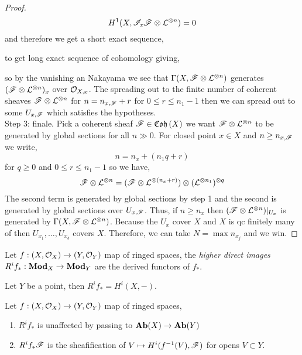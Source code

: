 \documentclass[12pt]{article}
\begin{document}
\begin{proof}
\[ H^1(X, \mathscr{I}_x \mathscr{F} \otimes \mathcal{L}^{\otimes n}) = 0 \]
and therefore we get a short exact sequence,
\begin{center}
\end{center}
to get long exact sequence of cohomology giving,
\begin{center}
\end{center}
so by the vanishing an Nakayama we see that $\Gamma(X, \mathscr{F} \otimes \mathcal{L}^{\otimes n})$ generates $(\mathscr{F} \otimes \mathcal{L}^{\otimes n})_x$ over $\mathcal{O}_{X, x}$. The spreading out to the finite number of coherent sheaves $\mathscr{F} \otimes \mathcal{L}^{\otimes n}$ for $n = n_{x, \mathscr{F}} + r$ for $0 \le r \le n_1 - 1$ then we can spread out to some $U_{x, \mathscr{F}}$ which satisfies the hypotheses. 
\bigskip\\
Step 3: finale. Pick a coherent sheaf $\mathscr{F} \in \mathfrak{Coh}\left(X\right)$ we want $\mathscr{F} \otimes \mathcal{L}^{\otimes n}$ to be generated by global sections for all $n \gg 0$. For closed point $x \in X$ and $n \ge n_{x, \mathscr{F}}$ we write,
\[ n = n_x + (n_1 q + r) \]
for $q \ge 0$ and $0 \le r \le n_1 - 1$ so we have,
\[ \mathscr{F} \otimes \mathcal{L}^{\otimes n} = (\mathscr{F} \otimes \mathcal{L}^{\otimes (n_x + r)}) \otimes (\mathcal{L}^{\otimes n_1})^{\otimes q} \]
The second term is generated by global sections by step 1 and the second is generated by global sections over $U_{x, \mathscr{F}}$. Thus, if $n \ge n_x$ then $(\mathscr{F} \otimes \mathcal{L}^{\otimes n})|_{U_x}$ is generated by $\Gamma(X, \mathscr{F} \otimes \mathcal{L}^{\otimes n})$. Because the $U_x$ cover $X$ and $X$ is qc finitely many of then $U_{x_1}, \dots, U_{x_b}$ covers $X$. Therefore, we can take $N = \max{n_{x_j}}$ and we win.  
\end{proof}

\begin{defn}
Let $f : (X, \mathcal{O}_{X}) \to (Y, \mathcal{O}_{Y})$ map of ringed spaces, the \textit{higher direct images} $R^i f_* : \mathbf{Mod}_{X} \to \mathbf{Mod}_{Y}$ are the derived functors of $f_*$. 
\end{defn}

\begin{rmk}
Let $Y$ be a point, then $R^i f_* = H^i(X,-)$.
\end{rmk}

\begin{lemma}
Let $f : (X, \mathcal{O}_{X}) \to (Y, \mathcal{O}_{Y})$ map of ringed spaces,
\begin{enumerate}
\item $R^i f_*$ is unaffected by passing to $\mathbf{Ab}(X) \to \mathbf{Ab}(Y)$
\item $R^i f_* \mathscr{F}$ is the sheafification of $V \mapsto H^i(f^{-1}(V), \mathscr{F})$ for opens $V \subset Y$.
\end{enumerate}
\end{lemma}
\end{document}
